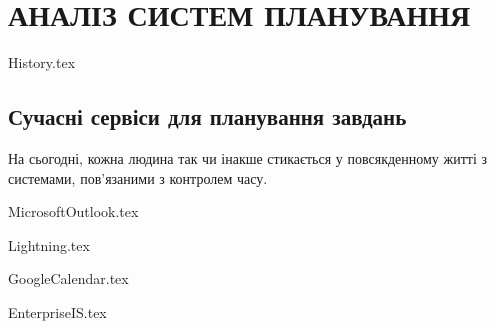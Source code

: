 \section{АНАЛІЗ СИСТЕМ ПЛАНУВАННЯ}

{History.tex}

\subsection{Сучасні сервіси для планування завдань}

На сьогодні, кожна людина так чи інакше стикається у повсякденному житті з системами, пов'язаними з контролем часу.

{MicrosoftOutlook.tex}

{Lightning.tex}

{GoogleCalendar.tex}

{EnterpriseIS.tex}
